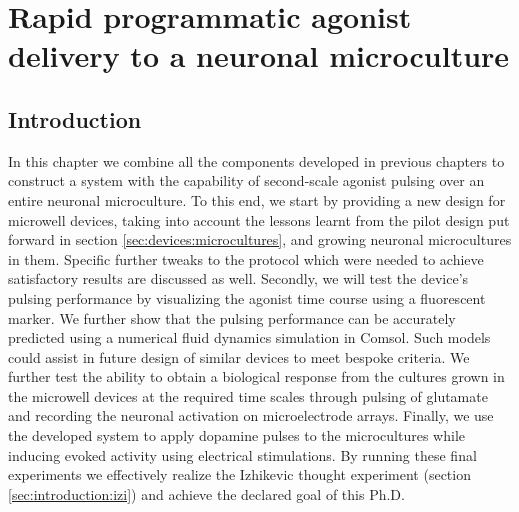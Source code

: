 \chapter{Rapid programmatic agonist delivery to a neuronal microculture}
\label{chap:microculturePulses}
\section{Introduction}
In this chapter we combine all the components developed in previous chapters to construct a system with the capability of second-scale agonist pulsing over an entire neuronal microculture. To this end, we  start by providing a new design for microwell devices, taking into account the lessons learnt from the pilot design put forward in section \ref{sec:devices:microcultures}, and growing neuronal microcultures in them. Specific further tweaks to the protocol which were needed to achieve satisfactory results are discussed as well. Secondly, we will test the device's pulsing performance by visualizing the agonist time course using a fluorescent marker. We further show that the pulsing performance can be accurately predicted using a numerical fluid dynamics simulation in Comsol. Such models could assist in future design of similar devices to meet bespoke criteria. We further test the ability to obtain a biological response from the cultures grown in the microwell devices at the required time scales through pulsing of glutamate and recording the neuronal activation on microelectrode arrays. Finally, we use the developed system to apply dopamine pulses to the microcultures while inducing evoked activity using electrical stimulations. By running these final experiments we effectively realize the Izhikevic thought experiment (section \ref{sec:introduction:izi}) and achieve the declared goal of this Ph.D.

